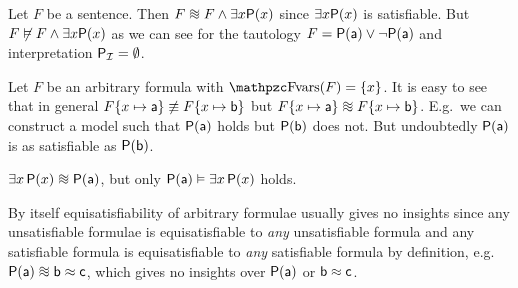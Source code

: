 \begin{example}
	Let \( F \) be a sentence.
	Then \( F \equisat F \land \exists x \mP(x) \) 
	since \( \exists x \mathsf{P}(x) \) is satisfiable.
	But \( F \not\vDash F \land \exists x \mathsf{P}(x) \)
	as we can see for the tautology \( F = \mathsf{P}(\mathsf{a})\lor\lnot\mathsf{P}(\mathsf{a}) \)
	and interpretation \( \mathsf{P}_{\mathcal{I}} = \emptyset \).
\end{example}



\begin{example}
	Let \(F\) be an arbitrary formula with \( \fvar(F) = \{ x \} \).
	It is easy to see that in general
	\( F\{ x\mapsto\mathsf{a} \} \not\equiv F\{ x\mapsto\mathsf{b} \} \)
	but
	\( F\{ x\mapsto\ma \} \equisat F\{ x\mapsto\mb \} \).
	E.g.~we can construct a model such that
	\(\mathsf{P}(\mathsf{a})\) holds but \(\mathsf{P}(\mathsf{b})\) does not.
	But undoubtedly \(\mathsf{P}(\mathsf{a})\) is as satisfiable as
	 \(\mathsf{P}(\mathsf{b})\).
\end{example}

\begin{example}
	\( \exists x \, \mP(x) \equisat \mP(\ma) \), but only
	\( \mathsf{P}(\mathsf{a}) \vDash \exists x \, \mathsf{P}(x) \) holds.
\end{example}


	By itself equisatisfiability of arbitrary formulae
	usually gives no insights since
	any unsatisfiable formulae is equisatisfiable to \emph{any} unsatisfiable formula
	and any satisfiable formula is equisatisfiable to \emph{any} satisfiable formula by definition,
	e.g.\ \(\mP(\ma) \equisat \mb\mEQ\mc \), which gives no insights over \( \mathsf{P}(\mathsf{a}) \) or \( \mathsf{b}\approx\mathsf{c} \). %

